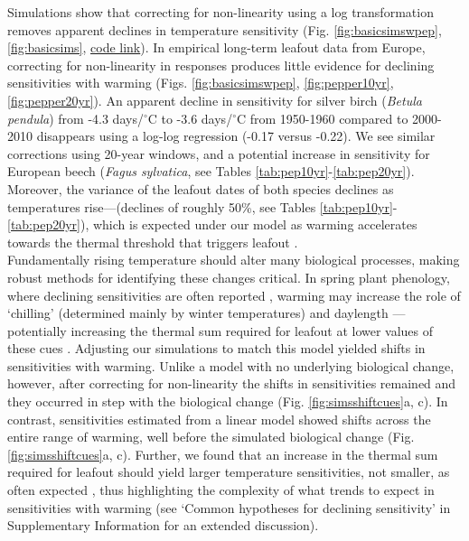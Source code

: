 \documentclass[11pt,letter]{article}
\newcommand{\R}[1]{\label{}\linelabel{#1}} %
\begin{document}
Simulations show that correcting for non-linearity using a log transformation removes apparent declines in temperature sensitivity (Fig. \ref{fig:basicsimswpep}, \ref{fig:basicsims}, \href{https://github.com/temporalecologylab/labgit/tree/master/projects/decsenspost}{code link}). In empirical long-term leafout data from Europe, correcting for non-linearity in responses\R{semantic3} produces little evidence for declining sensitivities with warming (Figs. \ref{fig:basicsimswpep}, \ref{fig:pepper10yr}, \ref{fig:pepper20yr}). An apparent decline in sensitivity for silver birch (\emph{Betula pendula}) from -4.3 days/$^{\circ}$C to -3.6 days/$^{\circ}$C from 1950-1960 compared to 2000-2010 disappears using a log-log regression (-0.17 versus -0.22). We see similar corrections using 20-year windows, and a potential increase in sensitivity for European beech (\emph{Fagus sylvatica}, see Tables \ref{tab:pep10yr}-\ref{tab:pep20yr}). Moreover, the variance of the leafout dates of both species declines as temperatures rise---(declines of roughly 50\%, see Tables \ref{tab:pep10yr}-\ref{tab:pep20yr}), which is expected under our model as warming accelerates towards the thermal threshold that triggers leafout \citep[and in contrast to predictions from changing mechanisms, see][]{ford2016}. \\

\R{biomattersstart}Fundamentally rising temperature should alter many biological processes, making robust methods for identifying these changes critical. In spring plant phenology, where declining sensitivities are often reported \citep{fu2015,piao2017,dai2019ag}, warming may increase the role of `chilling' (determined mainly by winter temperatures) and daylength \citep{Laube:2014a,zohner2016}---potentially increasing the thermal sum required for leafout at lower values of these cues \citep{Polgar2014,zohner2017,flynn2018}.\R{R4end} Adjusting our simulations to match this model yielded shifts in sensitivities with warming. Unlike a model with no underlying biological change, however, after correcting for non-linearity the shifts in sensitivities remained and they occurred in step with the biological change (Fig. \ref{fig:simsshiftcues}a, c). In contrast, sensitivities estimated from a linear model showed shifts across the entire range of warming, well before the simulated biological change (Fig. \ref{fig:simsshiftcues}a, c). Further, we found that an increase in the thermal sum required for leafout should yield larger temperature sensitivities, not smaller, as often expected \citep[e.g.,][]{fu2015}, thus highlighting the complexity of what trends to expect in sensitivities with warming (see `Common hypotheses for declining sensitivity' in Supplementary Information for an extended discussion).\R{biomattersend}  \\ %
\end{document}
